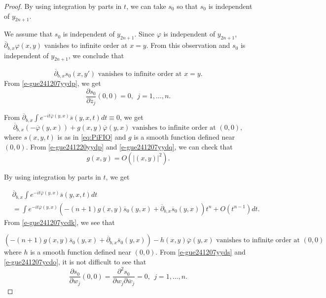 \documentclass[10pt,a4paper]{amsart}
\newcommand{\abs}[1]{\left\vert#1\right\vert}
\newcommand{\ddbar}{\overline\partial}
\newcommand{\ol}{\overline}
\newcommand{\pr}{\partial}
\begin{document}
\begin{proof}
By using integration by parts in $t$, we can take $s_0$ so that $s_0$ is independent of $y_{2n+1}$.

We assume that $s_0$ is independent of $y_{2n+1}$. Since $\varphi$ is independent of $y_{2n+1}$, $\ddbar_{b,x}\varphi(x,y)$ vanishes to infinite order at $x=y$. From this observation and $s_0$ is independent of $y_{2n+1}$, we conclude that 

\begin{equation}\label{e-gue241207yydp}
\mbox{$\ddbar_{b,x}s_0(x,y')$ vanishes to infinite order at $x=y$}.
\end{equation}
From \eqref{e-gue241207yydp}, we get 
\begin{equation}\label{e-gue241207yydq}
\frac{\pr s_0}{\pr\ol z_j}(0,0)=0,\ \ j=1,\ldots,n.
\end{equation} 

From $\ddbar_{b,x}\int e^{-it\ol\varphi(y,x)}\ol s(y,x,t)dt\equiv0$, we get 
\begin{equation}\label{e-gue241207yydr}
\mbox{$\ddbar_{b,x}(-\ol\varphi(y,x))+g(x,y)\ol\varphi(y,x)$ vanishes to infinite order at $(0,0)$},
\end{equation}
where $s(x,y,t)$ is as in \eqref{eq:PiFIO}  and $g$ is a smooth function defined near $(0,0)$. From \eqref{e-gue241220yydp} and \eqref{e-gue241207yydq}, we can check that 
\begin{equation}\label{e-gue241207yyds}
g(x,y)=O(\abs{(x,y)}^2).
\end{equation}

By using integration by parts in $t$, we get 

\begin{equation}\label{e-gue241207ycdk}
\begin{split}
&\ddbar_{b,x}\int e^{-it\ol\varphi(y,x)}\ol s(y,x,t)dt\\
&=\int e^{-it\ol\varphi(y,x)}(-(n+1)g(x,y)\ol s_0(y,x)+\ddbar_{b,x}\ol s_0(y,x))t^n+O(t^{n-1})dt.
\end{split}
\end{equation}
From \eqref{e-gue241207ycdk}, we see that 

\begin{equation}\label{e-gue241207ycdo}
\mbox{$(-(n+1)g(x,y)\ol s_0(y,x)+\ddbar_{b,x}\ol s_0(y,x))-h(x,y)\ol\varphi(y,x)$ vanishes to infinite order at $(0,0)$}, 
\end{equation}
where $h$ is a smooth function defined near $(0,0)$. From \eqref{e-gue241207yyds} and \eqref{e-gue241207ycdo}, it is not difficult to see that 
\begin{equation}\label{e-gue241207ycdg}
\frac{\pr s_0}{\pr w_j}(0,0)=\frac{\pr^2 s_0}{\pr w_j\pr\ol w_j}=0,\ \ j=1,\ldots,n.
\end{equation}


\end{proof}
\end{document}

